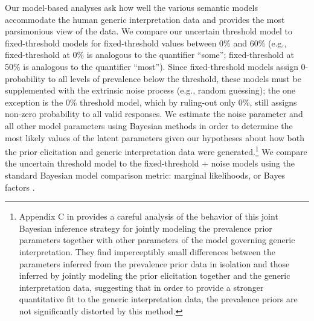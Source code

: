 \documentclass[floatsintext,doc]{apa6}
\let\rmarkdownfootnote\footnote%
\def\footnote{\protect\rmarkdownfootnote}
\newcommand{\ndg}[1]{{\textcolor{Green}{[ndg: #1]}}}
\begin{document}
Our model-based analyses ask how well the various semantic models accommodate the human generic interpretation data and provides the most parsimonious view of the data.
We compare our uncertain threshold model to fixed-threshold models for fixed-threshold values between 0\% and 60\% (e.g., fixed-threshold at 0\% is analogous to the quantifier ``some''; fixed-threshold at 50\% is analogous to the quantifier ``most''). 
Since fixed-threshold models assign 0-probability to all levels of prevalence below the threshold, these models must be supplemented with the extrinsic noise process (e.g., random guessing); the one exception is the 0\% threshold model, which by ruling-out only 0\%, still assigns non-zero probability to all valid responses. 
We estimate the noise parameter and all other model parameters using Bayesian methods in order to determine the most likely values of the latent parameters given our hypotheses about how both the prior elicitation and generic interpretation data were generated.\footnote{Appendix C in  provides a careful analysis of the behavior of this joint Bayesian inference strategy for jointly modeling the prevalence prior parameters together with other parameters of the model governing generic interpretation. They find imperceptibly small differences between the parameters inferred from the prevalence prior data in isolation and those inferred by jointly modeling the prior elicitation together and the generic interpretation data, suggesting that in order to provide a stronger quantitative fit to the generic interpretation data, the prevalence priors are not significantly distorted by this method.}
We compare the uncertain threshold model to the fixed-threshold + noise models using the standard Bayesian model comparison metric: marginal likelihoods, or Bayes factors \cite{LeeWagenmakers2014}.

\end{document}
